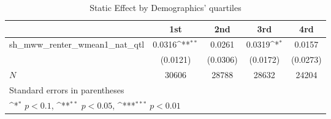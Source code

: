 \begin{table}[htbp]\centering
\def\sym#1{\ifmmode^{#1}\else\(^{#1}\)\fi}
\caption{Static Effect by Demographics' quartiles}
\begin{tabular}{l*{4}{c}}
\hline\hline
            &\multicolumn{1}{c}{1st}&\multicolumn{1}{c}{2nd}&\multicolumn{1}{c}{3rd}&\multicolumn{1}{c}{4rd}\\
\hline
sh\_mww\_renter\_wmean1\_nat\_qtl&      0.0316\sym{**} &      0.0261         &      0.0319\sym{*}  &      0.0157         \\
            &    (0.0121)         &    (0.0306)         &    (0.0172)         &    (0.0273)         \\
\hline
\(N\)       &       30606         &       28788         &       28632         &       24204         \\
\hline\hline
\multicolumn{5}{l}{\footnotesize Standard errors in parentheses}\\
\multicolumn{5}{l}{\footnotesize \sym{*} \(p<0.1\), \sym{**} \(p<0.05\), \sym{***} \(p<0.01\)}\\
\end{tabular}
\end{table}
